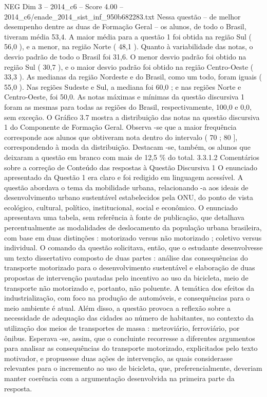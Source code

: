 \begin{textsample}{NEG Dim 3 – 2014\_c6 – Score 4.00 – 2014\_c6/enade\_2014\_sist\_inf\_950b682283.txt}
Nessa questão – de melhor desempenho dentre as duas de Formação Geral – os alunos, de todo o Brasil, tiveram média 53,4.
A maior média para a questão 1 foi obtida na região Sul ( 56,0 ), e a menor, na região Norte ( 48,1 ).
Quanto à variabilidade das notas, o desvio padrão de todo o Brasil foi 31,6.
O menor desvio padrão foi obtido na região Sul ( 30,7 ), e o maior desvio padrão foi obtido na região Centro-Oeste ( 33,3 ).
As medianas da região Nordeste e do Brasil, como um todo, foram iguais ( 55,0 ).
Nas regiões Sudeste e Sul, a mediana foi 60,0 ; e nas regiões Norte e Centro-Oeste, foi 50,0.
As notas máximas e mínimas da questão discursiva 1 foram as mesmas para todas as regiões do Brasil, respectivamente, 100,0 e 0,0, sem exceção.
O Gráfico 3.7 mostra a distribuição das notas na questão discursiva 1 do Componente de Formação Geral.
Observa -se que a maior frequência corresponde aos alunos que obtiveram nota dentro do intervalo ( 70 ; 80 ], correspondendo à moda da distribuição.
Destacam -se, também, os alunos que deixaram a questão em branco com mais de 12,5 \% do total. 3.3.1.2 Comentários sobre a correção de Conteúdo das respostas à Questão Discursiva 1 O enunciado apresentado da Questão 1 era claro e foi redigido em linguagem acessível.
A questão abordava o tema da mobilidade urbana, relacionando -a aos ideais de desenvolvimento urbano sustentável estabelecidos pela ONU, do ponto de vista ecológico, cultural, político, institucional, social e econômico.
O enunciado apresentava uma tabela, sem referência à fonte de publicação, que detalhava percentualmente as modalidades de deslocamento da população urbana brasileira, com base em duas distinções : motorizado versus não motorizado ; coletivo versus individual.
O comando da questão solicitava, então, que o estudante desenvolvesse um texto dissertativo composto de duas partes : análise das consequências do transporte motorizado para o desenvolvimento sustentável e elaboração de duas propostas de intervenção pautadas pelo incentivo ao uso da bicicleta, meio de transporte não motorizado e, portanto, não poluente.
A temática dos efeitos da industrialização, com foco na produção de automóveis, e consequências para o meio ambiente é atual.
Além disso, a questão provoca a reflexão sobre a necessidade de adequação das cidades ao número de habitantes, no contexto da utilização dos meios de transportes de massa : metroviário, ferroviário, por ônibus.
Esperava -se, assim, que o concluinte recorresse a diferentes argumentos para analisar as consequências do transporte motorizado, explicitados pelo texto motivador, e propusesse duas ações de intervenção, as quais considerasse relevantes para o incremento ao uso de bicicleta, que, preferencialmente, deveriam manter coerência com a argumentação desenvolvida na primeira parte da resposta.

\end{textsample}
